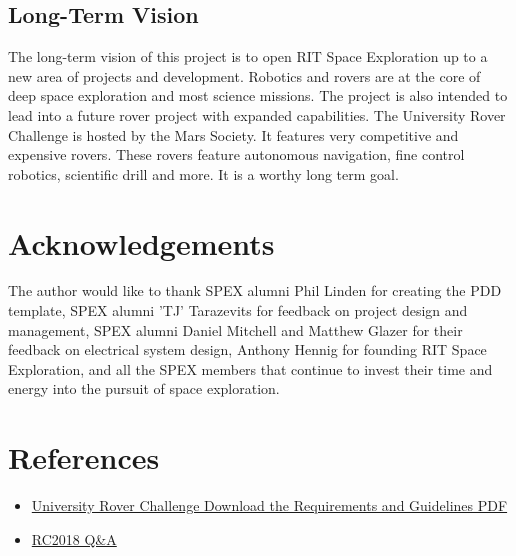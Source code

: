 \documentclass[conference]{IEEEtran} %
\begin{document}
\subsection{Long-Term Vision}
\label{subsec:vision}
The long-term vision of this project is to open RIT Space Exploration up to a new area of projects and development. 
Robotics and rovers are at the core of deep space exploration and most science missions. 
The project is also intended to lead into a future rover project with expanded capabilities.
The University Rover Challenge is hosted by the Mars Society. 
It features very competitive and expensive rovers. 
These rovers feature autonomous navigation, fine control robotics, scientific drill and more. 
It is a worthy long term goal. 

\section*{Acknowledgements}
The author would like to thank SPEX alumni Phil Linden for creating the PDD template, SPEX alumni 'TJ' Tarazevits for feedback on project design and management, SPEX alumni Daniel Mitchell and Matthew Glazer for their feedback on electrical system design, Anthony Hennig for founding RIT Space Exploration, and all the SPEX members that continue to invest their time and energy into the pursuit of space exploration. 

\section{References}
\begin{itemize}
  \item \href{http://urc.marssociety.org/files/University%20Rover%20Challenge%20Rules%202018.pdf}{University Rover Challenge Download the Requirements and Guidelines PDF}
  \item \href{http://urc.marssociety.org/home/q-a}{RC2018 Q\&A}
\end{itemize}
\onecolumn
\appendices{}
\end{document}
